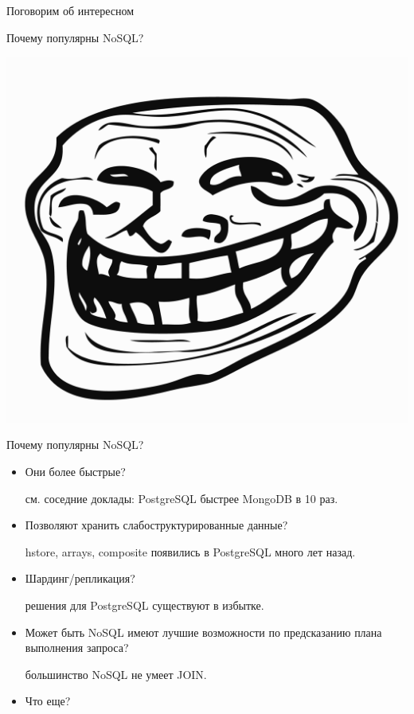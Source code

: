 \documentclass[aspectratio=169]{beamer}
\begin{document}
\begin{frame}{Поговорим об интересном}
    \begin{block}
        {\huge Почему популярны NoSQL?}
        \begin{center}
            \pause\includegraphics[scale=0.2]{img/Trollface_HD.png}
        \end{center}
    \end{block}
\end{frame}

\begin{frame}{Почему популярны NoSQL?}
    \begin{itemize}
        \pause\item Они более быстрые?
            \pause\par см. соседние доклады:
                PostgreSQL быстрее MongoDB в 10 раз.

        \pause\item Позволяют хранить слабоструктурированные данные?
            \pause\par hstore, arrays, composite появились в PostgreSQL
                много лет назад.

        \pause\item Шардинг/репликация?
            \pause\par решения для PostgreSQL существуют в избытке.

        \pause\item Может быть NoSQL имеют лучшие возможности
            по предсказанию плана выполнения запроса?
            \pause\par большинство NoSQL не умеет JOIN.

        \item Что еще?
    \end{itemize}
\end{frame}
\end{document}
